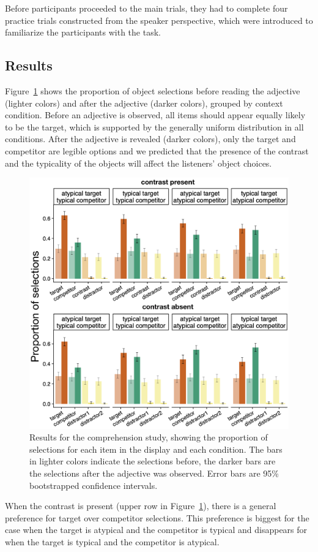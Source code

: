 \documentclass[10pt,letterpaper]{article}
\begin{document}
Before participants proceeded to the main trials, they had to complete four practice trials constructed from the speaker perspective, which were introduced to familiarize the participants with the task.


\subsection{Results}
Figure~\ref{compr-results} shows the proportion of object selections before reading the adjective (lighter colors) and after the adjective (darker colors), grouped by context condition. Before an adjective is observed, all items should appear equally likely to be the target, which is supported by the generally uniform distribution in all conditions. After the adjective is revealed (darker colors), only the target and competitor are legible options and we predicted that the presence of the contrast and the typicality of the objects will affect the listeners' object choices.

\begin{figure}
	\begin{center}
		\includegraphics[width=.475\textwidth]{graphs/compr-results.pdf}
	\end{center}
\caption{Results for the comprehension study, showing the proportion of selections for each item in the display and each condition. The bars in lighter colors indicate the selections before, the darker bars are the selections after the adjective was observed. Error bars are 95\% bootstrapped confidence intervals.} 
\label{compr-results}
\end{figure}

When the contrast is present (upper row in Figure~\ref{compr-results}), there is a general preference for target over competitor selections. This preference is biggest for the case when the target is atypical and the competitor is typical and disappears for when the target is typical and the competitor is atypical. 
\end{document}
